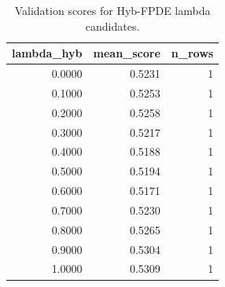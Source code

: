 \begin{table}[t]
\caption{Validation scores for Hyb-FPDE lambda candidates.}
\label{tab:lambda_distribution_computed}
\centering
\begin{tabular}{rrr}
\toprule
lambda\_hyb & mean\_score & n\_rows \\
\midrule
0.0000 & 0.5231 & 1 \\
0.1000 & 0.5253 & 1 \\
0.2000 & 0.5258 & 1 \\
0.3000 & 0.5217 & 1 \\
0.4000 & 0.5188 & 1 \\
0.5000 & 0.5194 & 1 \\
0.6000 & 0.5171 & 1 \\
0.7000 & 0.5230 & 1 \\
0.8000 & 0.5265 & 1 \\
0.9000 & 0.5304 & 1 \\
1.0000 & 0.5309 & 1 \\
\bottomrule
\end{tabular}

\end{table}
